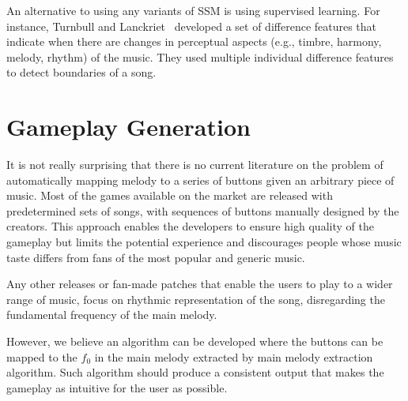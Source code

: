 An alternative to using any variants of SSM is using supervised learning. For instance, Turnbull and Lanckriet~\cite{segmentsupervised} developed a set of difference features that indicate when there are changes in perceptual aspects (e.g., timbre, harmony, melody, rhythm) of the music. They used multiple individual difference features to detect boundaries of a song. 

\vspace{20pt}

\section{Gameplay Generation}

It is not really surprising that there is no current literature on the problem of automatically mapping melody to a series of buttons given an arbitrary piece of music. Most of the games available on the market are released with predetermined sets of songs, with sequences of buttons manually designed by the creators. This approach enables the developers to ensure high quality of the gameplay but limits the potential experience and discourages people whose music taste differs from fans of the most popular and generic music. 

Any other releases or fan-made patches that enable the users to play to a wider range of music, focus on rhythmic representation of the song, disregarding the fundamental frequency of the main melody.

However, we believe an algorithm can be developed where the buttons can be mapped to the $f_{0}$ in the main melody extracted by main melody extraction algorithm. Such algorithm should produce a consistent output that makes the gameplay as intuitive for the user as possible.